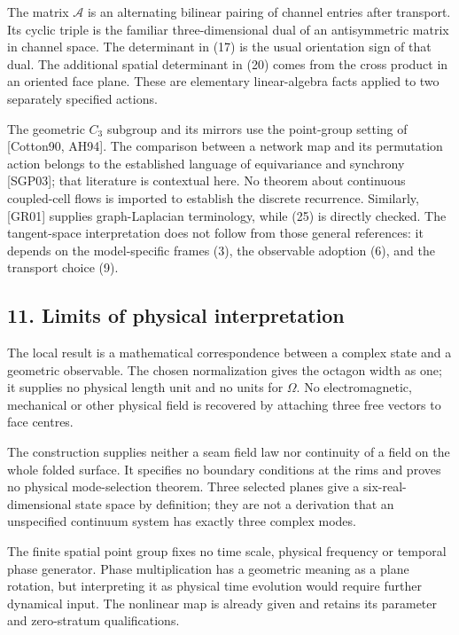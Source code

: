 \documentclass[
  11pt,
  a4paper,
]{article}
\begin{document}
The matrix \(\mathcal A\) is an alternating bilinear pairing of channel entries after transport. Its cyclic triple is the familiar three-dimensional dual of an antisymmetric matrix in channel space. The determinant in (17) is the usual orientation sign of that dual. The additional spatial determinant in (20) comes from the cross product in an oriented face plane. These are elementary linear-algebra facts applied to two separately specified actions.

The geometric \(C_3\) subgroup and its mirrors use the point-group setting of {[}Cotton90, AH94{]}. The comparison between a network map and its permutation action belongs to the established language of equivariance and synchrony {[}SGP03{]}; that literature is contextual here. No theorem about continuous coupled-cell flows is imported to establish the discrete recurrence. Similarly, {[}GR01{]} supplies graph-Laplacian terminology, while (25) is directly checked. The tangent-space interpretation does not follow from those general references: it depends on the model-specific frames (3), the observable adoption (6), and the transport choice (9).

\subsection{11. Limits of physical interpretation}\label{limits-of-physical-interpretation}

The local result is a mathematical correspondence between a complex state and a geometric observable. The chosen normalization gives the octagon width as one; it supplies no physical length unit and no units for \(\Omega\). No electromagnetic, mechanical or other physical field is recovered by attaching three free vectors to face centres.

The construction supplies neither a seam field law nor continuity of a field on the whole folded surface. It specifies no boundary conditions at the rims and proves no physical mode-selection theorem. Three selected planes give a six-real-dimensional state space by definition; they are not a derivation that an unspecified continuum system has exactly three complex modes.

The finite spatial point group fixes no time scale, physical frequency or temporal phase generator. Phase multiplication has a geometric meaning as a plane rotation, but interpreting it as physical time evolution would require further dynamical input. The nonlinear map is already given and retains its parameter and zero-stratum qualifications.
\end{document}
